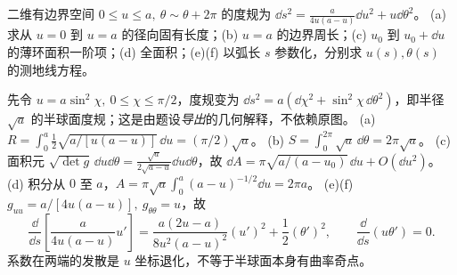 \begin{exercise}
二维有边界空间 $0\le u\le a,\ \theta\sim\theta+2\pi$ 的度规为
$\dd s^2=\frac{a}{4u(a-u)}\dd u^2+u\dd\theta^2$。
(a) 求从 $u=0$ 到 $u=a$ 的径向固有长度；(b) $u=a$ 的边界周长；(c) $u_0$ 到 $u_0+\dd u$ 的薄环面积一阶项；(d) 全面积；(e)(f) 以弧长 $s$ 参数化，分别求 $u(s),\theta(s)$ 的测地线方程。
\end{exercise}
\begin{solution}
先令 $u=a\sin^2\chi,\ 0\le\chi\le\pi/2$，度规变为
$\dd s^2=a(\dd\chi^2+\sin^2\chi\,\dd\theta^2)$，即半径 $\sqrt a$ 的半球面度规；这是由题设\emph{导出}的几何解释，不依赖原图。
(a) $R=\int_0^a\frac12\sqrt{a/[u(a-u)]}\,\dd u=(\pi/2)\sqrt a$。
(b) $S=\int_0^{2\pi}\sqrt a\,\dd\theta=2\pi\sqrt a$。
(c) 面积元 $\sqrt{\det g}\,\dd u\dd\theta=\frac{\sqrt a}{2\sqrt{a-u}}\dd u\dd\theta$，故 $\dd A=\pi\sqrt{a/(a-u_0)}\,\dd u+O(\dd u^2)$。
(d) 积分从 $0$ 至 $a$，$A=\pi\sqrt a\int_0^a(a-u)^{-1/2}\dd u=2\pi a$。
(e)(f) $g_{uu}=a/[4u(a-u)],\ g_{\theta\theta}=u$，故
\[
\frac{\dd}{\dd s}\left[\frac{a}{4u(a-u)}u'\right]
=\frac{a(2u-a)}{8u^2(a-u)^2}(u')^2+\frac12(\theta')^2,
\qquad
\frac{\dd}{\dd s}(u\theta')=0.
\]
系数在两端的发散是 $u$ 坐标退化，不等于半球面本身有曲率奇点。
\end{solution}
